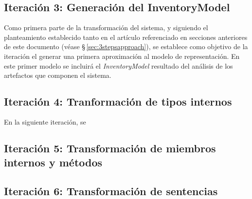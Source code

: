 \subsection{Iteración 3: Generación del InventoryModel}

Como primera parte de la transformación del sistema, y siguiendo el planteamiento establecido tanto en el artículo referenciado en secciones anteriores de este
documento (véase \S\,\ref{sec:3stepsapproach}), se establece como objetivo de la iteración el generar una primera aproximación al modelo de representación. En 
este primer modelo se incluirá el \textit{InventoryModel} resultado del análisis de los artefactos que componen el sistema. 



\subsection{Iteración 4: Tranformación de tipos internos}

En la siguiente iteración, se 
\subsection{Iteración 5: Transformación de miembros internos y métodos}



\subsection{Iteración 6: Transformación de sentencias}

